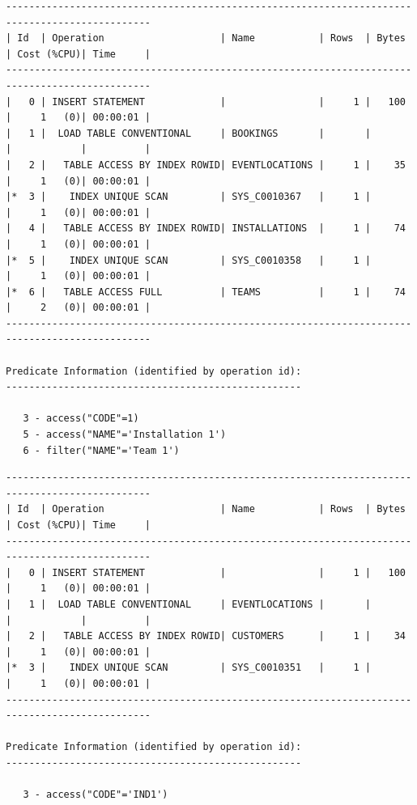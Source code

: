 {\scriptsize
    \begin{verbatim}
-----------------------------------------------------------------------------------------------
| Id  | Operation                    | Name           | Rows  | Bytes | Cost (%CPU)| Time     |
-----------------------------------------------------------------------------------------------
|   0 | INSERT STATEMENT             |                |     1 |   100 |     1   (0)| 00:00:01 |
|   1 |  LOAD TABLE CONVENTIONAL     | BOOKINGS       |       |       |            |          |
|   2 |   TABLE ACCESS BY INDEX ROWID| EVENTLOCATIONS |     1 |    35 |     1   (0)| 00:00:01 |
|*  3 |    INDEX UNIQUE SCAN         | SYS_C0010367   |     1 |       |     1   (0)| 00:00:01 |
|   4 |   TABLE ACCESS BY INDEX ROWID| INSTALLATIONS  |     1 |    74 |     1   (0)| 00:00:01 |
|*  5 |    INDEX UNIQUE SCAN         | SYS_C0010358   |     1 |       |     1   (0)| 00:00:01 |
|*  6 |   TABLE ACCESS FULL          | TEAMS          |     1 |    74 |     2   (0)| 00:00:01 |
-----------------------------------------------------------------------------------------------
 
Predicate Information (identified by operation id):
---------------------------------------------------
 
   3 - access("CODE"=1)
   5 - access("NAME"='Installation 1')
   6 - filter("NAME"='Team 1')

\end{verbatim}
}
{\scriptsize
\begin{verbatim}
-----------------------------------------------------------------------------------------------
| Id  | Operation                    | Name           | Rows  | Bytes | Cost (%CPU)| Time     |
-----------------------------------------------------------------------------------------------
|   0 | INSERT STATEMENT             |                |     1 |   100 |     1   (0)| 00:00:01 |
|   1 |  LOAD TABLE CONVENTIONAL     | EVENTLOCATIONS |       |       |            |          |
|   2 |   TABLE ACCESS BY INDEX ROWID| CUSTOMERS      |     1 |    34 |     1   (0)| 00:00:01 |
|*  3 |    INDEX UNIQUE SCAN         | SYS_C0010351   |     1 |       |     1   (0)| 00:00:01 |
-----------------------------------------------------------------------------------------------

Predicate Information (identified by operation id):
---------------------------------------------------
 
   3 - access("CODE"='IND1')
\end{verbatim}
}

